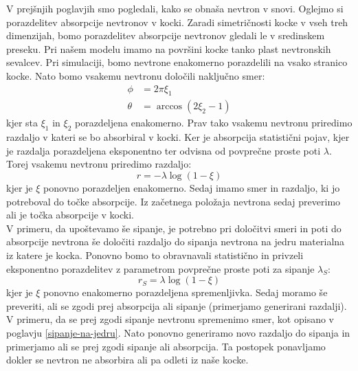 \documentclass[slovene,11pt,a4paper]{article}
\numberwithin{equation}{section} %
\numberwithin{figure}{section} %
\numberwithin{table}{section} %
\begin{document}
V prejšnjih poglavjih smo pogledali, kako se obnaša nevtron v snovi. Oglejmo si porazdelitev absorpcije nevtronov v kocki. Zaradi simetričnosti kocke v vseh treh dimenzijah, bomo porazdelitev absorpcije nevtronov gledali le v sredinskem preseku. Pri našem modelu imamo na površini kocke tanko plast nevtronskih sevalcev. Pri simulaciji, bomo nevtrone enakomerno porazdelili na vsako stranico kocke. Nato bomo vsakemu nevtronu določili naključno smer:
\begin{equation}
\begin{aligned}
\phi &= 2 \pi \xi_1 \\
\theta &=\arccos( 2 \xi_2 -1)
\end{aligned}
\end{equation}
kjer sta $\xi_1$ in $\xi_2$ porazdeljena enakomerno. Prav tako vsakemu nevtronu priredimo razdaljo v kateri se bo absorbiral v kocki. Ker je absorpcija statistični pojav, kjer je razdalja porazdeljena eksponentno ter odvisna od povprečne proste poti $\lambda$. Torej vsakemu nevtronu priredimo razdaljo:
\begin{equation}
r=- \lambda \log(1-\xi)
\end{equation}
kjer je $\xi$ ponovno porazdeljen enakomerno.
Sedaj imamo smer in razdaljo, ki jo potreboval do točke absorpcije. Iz začetnega položaja nevtrona sedaj preverimo ali je točka absorpcije v kocki.\\
V primeru, da upoštevamo še sipanje, je potrebno pri določitvi smeri in poti do absorpcije nevtrona še določiti razdaljo do sipanja nevtrona na jedru materialna iz katere je kocka. Ponovno bomo to obravnavali statistično in privzeli eksponentno porazdelitev z parametrom povprečne proste poti za sipanje $\lambda_S$:
\begin{equation}
r_S=\lambda \log(1-\xi)
\end{equation}
kjer je $\xi$ ponovno enakomerno porazdeljena spremenljivka. Sedaj moramo še preveriti, ali se zgodi prej absorpcija ali sipanje (primerjamo generirani razdalji). V primeru, da se prej zgodi sipanje nevtronu spremenimo smer, kot opisano v poglavju \ref{sipanje-na-jedru}. Nato ponovno generiramo novo razdaljo do sipanja in primerjamo ali se prej zgodi sipanje ali absorpcija. Ta postopek ponavljamo dokler se nevtron ne absorbira ali pa odleti iz naše kocke.
\end{document}
